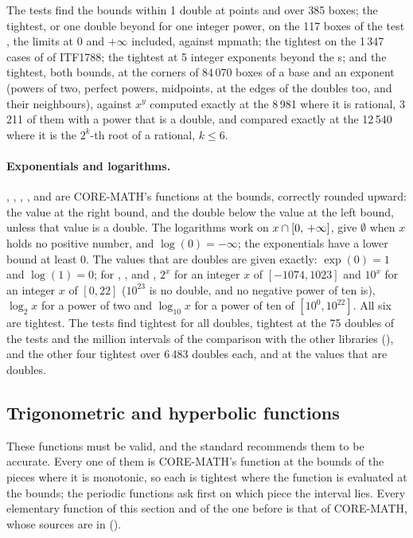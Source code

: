 \documentclass[12pt,a4paper,twoside,openright]{book}
\begin{document}
The tests find the bounds within 1 double at points and over 385 boxes; the
tightest, or one double beyond for one integer power, on the 117 boxes of
the test , the limits at $0$ and $+\infty$ included, against
mpmath; the tightest on the 1\,347 cases of  of ITF1788; the
tightest at 5 integer exponents beyond the s; and the tightest,
both bounds, at the corners of 84\,070 boxes of a base and an exponent
(powers of two, perfect powers, midpoints, at the edges of the doubles too,
and their neighbours), against $x^y$ computed exactly at the 8\,981 where
it is rational, 3\,211 of them with a power that is a double, and compared
exactly at the 12\,540 where it is the $2^k$-th root of a rational,
$k\leq6$.

\paragraph{Exponentials and logarithms.}
, , , ,  and
 are CORE-MATH's functions at the bounds, correctly rounded
upward: the value at the right bound, and the double below the value at the
left bound, unless that value is a double. The logarithms work on
$x\cap[0,\,+\infty]$, give $\emptyset$ when $x$ holds no positive
number, and $\log(0)=-\infty$; the exponentials have a lower bound at least
$0$. The values that are doubles are given exactly: $\exp(0)=1$ and
$\log(1)=0$; for , ,  and
,\newinvfive{} $2^x$ for an integer $x$ of $[-1074, 1023]$ and
$10^x$ for an integer $x$ of $[0, 22]$ ($10^{23}$ is no double, and no
negative power of ten is), $\log_2 x$ for a power of two and $\log_{10}x$
for a power of ten of $[10^0, 10^{22}]$. All six are tightest. The tests
find  tightest for all doubles,  tightest at the 75
doubles of the tests and the million intervals of the comparison with the
other libraries (), and the other four tightest over
6\,483 doubles each, and at the values that are doubles.

\subsection{Trigonometric and hyperbolic functions}\label{sec:accuracy-trig}

These functions must be valid, and the standard recommends them to be
accurate. Every one of them is CORE-MATH's function at the bounds of the
pieces where it is monotonic, so each is tightest where the function is
evaluated at the bounds; the periodic functions ask first on which piece
the interval lies. Every elementary function of this section and of the
one before is that of CORE-MATH, whose sources are in 
().
\end{document}

